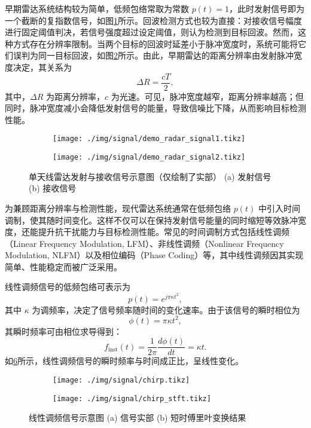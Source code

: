 早期雷达系统结构较为简单，低频包络常取为常数 $p(t) = 1$，此时发射信号即为一个截断的复指数信号，如图\ref{fig_radar_signal_1_1}所示。回波检测方式也较为直接：对接收信号幅度进行固定阈值判决，若信号强度超过设定阈值，则认为检测到目标回波。然而，这种方式存在分辨率限制。当两个目标的回波时延差小于脉冲宽度时，系统可能将它们误判为同一目标回波，如图\ref{fig_radar_signal_1_2}所示。由此，早期雷达的距离分辨率由发射脉冲宽度决定，其关系为
\begin{equation}
    \Delta R = \frac{cT}{2},
\end{equation}
其中，$\Delta R$ 为距离分辨率，$c$ 为光速。可见，脉冲宽度越窄，距离分辨率越高；但同时，脉冲宽度减小会降低发射信号的能量，导致信噪比下降，从而影响目标检测性能。

\begin{figure}[htb!]
    \centering
    \begin{subfigure}{.45\textwidth}
        \centering
        \texttt{[image: ./img/signal/demo\_radar\_signal1.tikz]}
        \caption{}
        \label{fig_radar_signal_1_1}
    \end{subfigure}
    \begin{subfigure}{.45\textwidth}
        \centering
        \texttt{[image: ./img/signal/demo\_radar\_signal2.tikz]}
        \caption{}
        \label{fig_radar_signal_1_2}
    \end{subfigure}
    \caption{单天线雷达发射与接收信号示意图（仅绘制了实部） (a) 发射信号 (b) 接收信号}
    \label{fig_radar_signal_1}
\end{figure}

为兼顾距离分辨率与检测性能，现代雷达系统通常在低频包络 $p(t)$ 中引入时间调制，使其随时间变化。这样不仅可以在保持发射信号能量的同时缩短等效脉冲宽度，还能提升抗干扰能力与目标检测性能。常见的时间调制方式包括线性调频（Linear Frequency Modulation, LFM）、非线性调频（Nonlinear Frequency Modulation, NLFM）以及相位编码（Phase Coding）等，其中线性调频因其实现简单、性能稳定而被广泛采用。

线性调频信号的低频包络可表示为
\[
    p(t) = e^{j \pi \kappa t^2},
\]
其中 $\kappa$ 为调频率，决定了信号频率随时间的变化速率。由于该信号的瞬时相位为
\[
    \phi(t) = \pi \kappa t^2,
\]
其瞬时频率可由相位求导得到：
\[
    f_{\text{inst}}(t) = \frac{1}{2\pi} \frac{d \phi(t)}{dt} = \kappa t.
\]
如\cref{fig_chirp}所示，线性调频信号的瞬时频率与时间成正比，呈线性变化。

\begin{figure}[htb!]
    \centering
    \begin{subfigure}{.45\textwidth}
        \centering
        \texttt{[image: ./img/signal/chirp.tikz]}
        \caption{}
        \label{fig_chirp_1}
    \end{subfigure}
    \begin{subfigure}{.45\textwidth}
        \centering
        \texttt{[image: ./img/signal/chirp\_stft.tikz]}
        \caption{}
        \label{fig_chirp_2}
    \end{subfigure}
    \caption{线性调频信号示意图 (a) 信号实部 (b) 短时傅里叶变换结果}
    \label{fig_chirp}
\end{figure}

